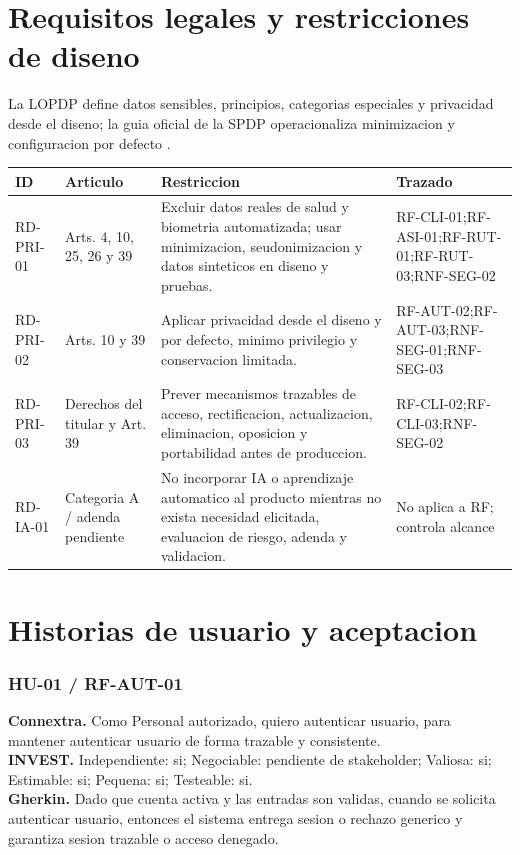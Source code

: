 \documentclass[11pt,a4paper,twoside]{article}
\begin{document}
\section{Requisitos legales y restricciones de diseno}
La LOPDP define datos sensibles, principios, categorias especiales y privacidad desde el diseno; la guia oficial de la SPDP operacionaliza minimizacion y configuracion por defecto \cite{lopdp2021,spdp2025,spdp2026}.
\small\begin{longtable}{p{1.8cm}p{2.2cm}p{6.5cm}p{3.7cm}}
\hline ID & Articulo & Restriccion & Trazado \\ \hline
RD-PRI-01 & Arts. 4, 10, 25, 26 y 39 & Excluir datos reales de salud y biometria automatizada; usar minimizacion, seudonimizacion y datos sinteticos en diseno y pruebas. & RF-CLI-01;RF-ASI-01;RF-RUT-01;RF-RUT-03;RNF-SEG-02 \\ \hline
RD-PRI-02 & Arts. 10 y 39 & Aplicar privacidad desde el diseno y por defecto, minimo privilegio y conservacion limitada. & RF-AUT-02;RF-AUT-03;RNF-SEG-01;RNF-SEG-03 \\ \hline
RD-PRI-03 & Derechos del titular y Art. 39 & Prever mecanismos trazables de acceso, rectificacion, actualizacion, eliminacion, oposicion y portabilidad antes de produccion. & RF-CLI-02;RF-CLI-03;RNF-SEG-02 \\ \hline
RD-IA-01 & Categoria A / adenda pendiente & No incorporar IA o aprendizaje automatico al producto mientras no exista necesidad elicitada, evaluacion de riesgo, adenda y validacion. & No aplica a RF; controla alcance \\ \hline
\end{longtable}\normalsize

\section{Historias de usuario y aceptacion}

\subsubsection{HU-01 / RF-AUT-01}
\textbf{Connextra.} Como Personal autorizado, quiero autenticar usuario, para mantener autenticar usuario de forma trazable y consistente.\\
\textbf{INVEST.} Independiente: si; Negociable: pendiente de stakeholder; Valiosa: si; Estimable: si; Pequena: si; Testeable: si.\\
\textbf{Gherkin.} Dado que cuenta activa y las entradas son validas, cuando se solicita autenticar usuario, entonces el sistema entrega sesion o rechazo generico y garantiza sesion trazable o acceso denegado.
\end{document}
